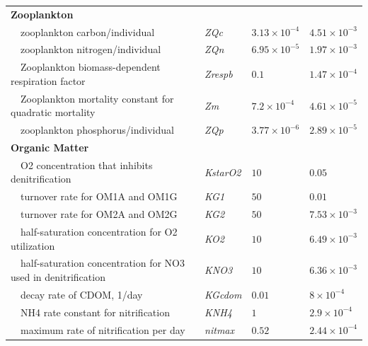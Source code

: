 \documentclass[letterpaper,12pt,oneside]{article}\usepackage[]{graphicx}\usepackage[]{color}
\begin{document}
\begin{table}[!tbp]
{\begin{center}
\begin{tabular}{llll}
\hline
{\bfseries Zooplankton}&&&\tabularnewline
~~zooplankton carbon/individual&\textit{ZQc}&$3.13\times 10^{-4}$&$4.51\times 10^{-3}$\tabularnewline
~~zooplankton nitrogen/individual&\textit{ZQn}&$6.95\times 10^{-5}$&$1.97\times 10^{-3}$\tabularnewline
~~Zooplankton biomass-dependent respiration factor&\textit{Zrespb}&$0.1$&$1.47\times 10^{-4}$\tabularnewline
~~Zooplankton mortality constant for quadratic mortality&\textit{Zm}&$7.2\times 10^{-4}$&$4.61\times 10^{-5}$\tabularnewline
~~zooplankton phosphorus/individual&\textit{ZQp}&$3.77\times 10^{-6}$&$2.89\times 10^{-5}$\tabularnewline
\hline
{\bfseries Organic Matter}&&&\tabularnewline
~~O2 concentration that inhibits denitrification&\textit{KstarO2}&$10$&$0.05$\tabularnewline
~~turnover rate for OM1A and OM1G&\textit{KG1}&$50$&$0.01$\tabularnewline
~~turnover rate for OM2A and OM2G&\textit{KG2}&$50$&$7.53\times 10^{-3}$\tabularnewline
~~half-saturation concentration for O2 utilization&\textit{KO2}&$10$&$6.49\times 10^{-3}$\tabularnewline
~~half-saturation concentration for NO3 used in denitrification&\textit{KNO3}&$10$&$6.36\times 10^{-3}$\tabularnewline
~~decay rate of CDOM, 1/day&\textit{KGcdom}&$0.01$&$8\times 10^{-4}$\tabularnewline
~~NH4 rate constant for nitrification&\textit{KNH4}&$1$&$2.9\times 10^{-4}$\tabularnewline
~~maximum rate of nitrification per day&\textit{nitmax}&$0.52$&$2.44\times 10^{-4}$\tabularnewline
\hline
\end{tabular}\end{center}}

\end{table}





\clearpage

\end{document}
